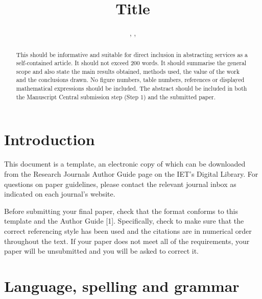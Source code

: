 \documentclass{cta-author}
\begin{document}

\title{Title}

\author{, , }

\address{
}

\begin{abstract}
This should be informative and suitable for direct
inclusion in abstracting services as a self-contained
article. It should not exceed 200 words. It should
summarise the general scope and also state the main results
obtained, methods used, the value of the work and the
conclusions drawn. No figure numbers, table numbers,
references or displayed mathematical expressions should be
included. The abstract should be included in both the
Manuscript Central submission step (Step 1) and the
submitted paper.
\end{abstract}

\maketitle

\section{Introduction}\label{sec1}

This document is a template, an electronic copy of which
can be downloaded from the Research Journals Author Guide
page on the IET's Digital Library. For questions on paper
guidelines, please contact the relevant journal inbox as
indicated on each journal's website.

Before submitting your final paper, check that the format
conforms to this template and the Author Guide [1].
Specifically, check to make sure that the correct
referencing style has been used and the citations are in
numerical order throughout the text. If your paper does not
meet all of the requirements, your paper will be
unsubmitted and you will be asked to correct it.

\section{Language, spelling and grammar}\label{sec2}
\end{document}
